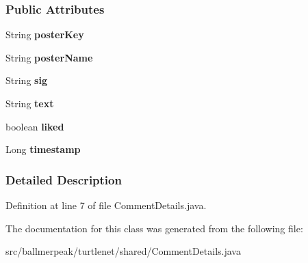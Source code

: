 \subsubsection*{Public Attributes}
\begin{DoxyCompactItemize}
\item 
\hypertarget{classballmerpeak_1_1turtlenet_1_1shared_1_1CommentDetails_a018d0738dd22703504c33b3bb6f8871a}{String {\bfseries poster\-Key}}\label{classballmerpeak_1_1turtlenet_1_1shared_1_1CommentDetails_a018d0738dd22703504c33b3bb6f8871a}

\item 
\hypertarget{classballmerpeak_1_1turtlenet_1_1shared_1_1CommentDetails_a0feb9ab9c020b33ca5053ae2d6992b44}{String {\bfseries poster\-Name}}\label{classballmerpeak_1_1turtlenet_1_1shared_1_1CommentDetails_a0feb9ab9c020b33ca5053ae2d6992b44}

\item 
\hypertarget{classballmerpeak_1_1turtlenet_1_1shared_1_1CommentDetails_a6512dd32f4aab495d61c7592e8e38583}{String {\bfseries sig}}\label{classballmerpeak_1_1turtlenet_1_1shared_1_1CommentDetails_a6512dd32f4aab495d61c7592e8e38583}

\item 
\hypertarget{classballmerpeak_1_1turtlenet_1_1shared_1_1CommentDetails_a4aa59661e2b3ef7c1a3d25e38c53d7bf}{String {\bfseries text}}\label{classballmerpeak_1_1turtlenet_1_1shared_1_1CommentDetails_a4aa59661e2b3ef7c1a3d25e38c53d7bf}

\item 
\hypertarget{classballmerpeak_1_1turtlenet_1_1shared_1_1CommentDetails_a7aa48bc7182ff337eba405d2d7bb053f}{boolean {\bfseries liked}}\label{classballmerpeak_1_1turtlenet_1_1shared_1_1CommentDetails_a7aa48bc7182ff337eba405d2d7bb053f}

\item 
\hypertarget{classballmerpeak_1_1turtlenet_1_1shared_1_1CommentDetails_a8ac94ee627e504421f05caf66e592aff}{Long {\bfseries timestamp}}\label{classballmerpeak_1_1turtlenet_1_1shared_1_1CommentDetails_a8ac94ee627e504421f05caf66e592aff}

\end{DoxyCompactItemize}


\subsubsection{Detailed Description}


Definition at line 7 of file Comment\-Details.\-java.



The documentation for this class was generated from the following file\-:\begin{DoxyCompactItemize}
\item 
src/ballmerpeak/turtlenet/shared/Comment\-Details.\-java\end{DoxyCompactItemize}
